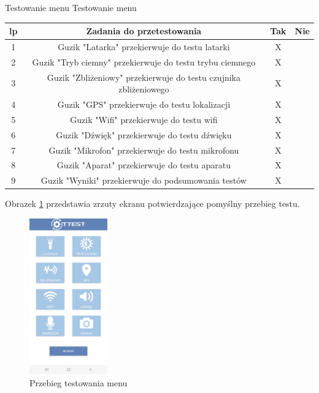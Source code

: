 \begin{tabela}
	{Testowanie menu}	%
	{Testowanie menu}	%
	{
		\begin{tabular}{|c|c|c|c|} \hline
			\textbf{lp} & \textbf{Zadania do przetestowania} & \textbf{Tak} & \textbf{Nie} \\ \hline
			1 & Guzik "Latarka" przekierwuje do testu latarki & X & ~ \\ \hline
			2 & Guzik "Tryb ciemny" przekierwuje do testu trybu ciemnego & X & ~ \\ \hline
			3 & Guzik "Zbliżeniowy" przekierwuje do testu czujnika zbliżeniowego & X & ~ \\ \hline
			4 & Guzik "GPS" przekierwuje do testu lokalizacji & X & ~ \\ \hline
			5 & Guzik "Wifi" przekierwuje do testu wifi & X & ~ \\ \hline
			6 & Guzik "Dźwięk" przekierwuje do testu dźwięku & X & ~ \\ \hline
			7 & Guzik "Mikrofon" przekierwuje do testu mikrofonu & X & ~ \\ \hline
			8 & Guzik "Aparat" przekierwuje do testu aparatu & X & ~ \\ \hline
			9 & Guzik "Wyniki" przekierwuje do podsumowania testów & X & ~ \\ \hline
	\end{tabular}	}
	\label{tab:tablica_menu}
\end{tabela}

Obrazek \ref{rys:menu} przedstawia zrzuty ekranu potwierdzające pomyślny przebieg testu.

\begin{figure}[!hbt]
	\begin{center}
		\includegraphics[angle=360, width=0.30\textwidth]{rys/punkt5/menu.jpg}
		\caption{Przebieg testowania menu}
		\label{rys:menu}
	\end{center}
\end{figure}   

